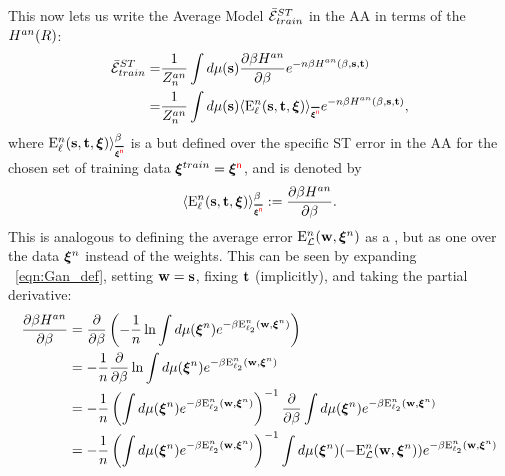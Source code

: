 %
This now lets us write the Average Model \TrainingError $\bar{\mathcal{E}}^{ST}_{train}$ in the AA in terms of the \AnnealedHamiltonian $H^{an}(R)$:
  \begin{align}
  \nonumber
  \AVGSTTE
   =& \dfrac{1}{Z^{an}_{\ND}}\int d\mu(\SVEC)\dfrac{\partial \beta\HAN}{\partial \beta} e^{-\ND\beta\HAN(\beta,\SVEC,\TVEC)} \\ 
  \label{eqn:EtM2}
   =& \dfrac{1}{Z^{an}_{\ND}}\int d\mu(\SVEC)\langle  \DELBFell(\SVEC,\TVEC,\XI) \rangle_{\AVGNDXI} e^{-\ND\beta\HAN(\beta,\SVEC,\TVEC)}  ,
  \end{align}
  where $\DELBFell(\SVEC,\TVEC,\XI) \rangle^{\beta}_{\AVGNDXI}$
  is a \ThermalAverage but defined over the specific ST error in the AA for the chosen set of training data $\boldsymbol{\xi}^{train}=\boldsymbol{\xi}^{{\color{red}\sf{n}}}$, and is denoted by 
 \begin{align}
   \langle  \DELBFell(\SVEC,\TVEC,\XI) \rangle^{\beta}_{\AVGNDXI}:=\dfrac{\partial \beta\HAN}{\partial \beta}.
 \end{align}
 This is analogous to defining the average error $\mathbf{\mathrm{E}}^{n}_{\mathcal{L}}(\mathbf{w}, \boldsymbol{\xi}^{n})$ as a \ThermalAverage, but as one over the data $\boldsymbol{\xi}^{n}$ instead of the weights.  This can be seen by expanding \EQN~\ref{eqn:Gan_def}, setting ${\mathbf{w}}={\mathbf{s}}$, fixing ${\mathbf{t}}$ (implicitly), and taking the partial derivative:
 \begin{align}
  \label{eqn:partial_Gan}
  \dfrac{\partial \beta H^{an}}{\partial \beta}
  &=  \dfrac{\partial }{\partial \beta} \left(-\frac{1}{n}\ln \int d\mu(\boldsymbol{\xi}^{n})e^{-\beta\mathbf{\mathrm{E}}^{n}_{\ell_2}(\mathbf{w}, \boldsymbol{\xi}^{n})}\right) \\ \nonumber
  &=  -\frac{1}{n}\dfrac{\partial }{\partial \beta} \ln \int d\mu(\boldsymbol{\xi}^{n})e^{-\beta\mathbf{\mathrm{E}}^{n}_{\ell_2}(\mathbf{w}, \boldsymbol{\xi}^{n})} \\ \nonumber
  &=  -\frac{1}{n} \left( \int d\mu(\boldsymbol{\xi}^{n})e^{-\beta\mathbf{\mathrm{E}}^{n}_{\ell_2}(\mathbf{w}, \boldsymbol{\xi}^{n})}\right)^{-1}\dfrac{\partial }{\partial \beta} \int d\mu(\boldsymbol{\xi}^{n})e^{-\beta\mathbf{\mathrm{E}}^{n}_{\ell_2}(\mathbf{w}, \boldsymbol{\xi}^{n})} \\ \nonumber
    &=  -\frac{1}{n} \left(\int d\mu(\boldsymbol{\xi}^{n})e^{-\beta\mathbf{\mathrm{E}}^{n}_{\ell_2}(\mathbf{w}, \boldsymbol{\xi}^{n})}\right)^{-1} \int d\mu(\boldsymbol{\xi}^{n})(-\mathbf{\mathrm{E}}^{n}_{\mathcal{L}}(\mathbf{w}, \boldsymbol{\xi}^{n}))e^{-\beta\mathbf{\mathrm{E}}^{n}_{\ell_2}(\mathbf{w}, \boldsymbol{\xi}^{n})}
 \end{align}

